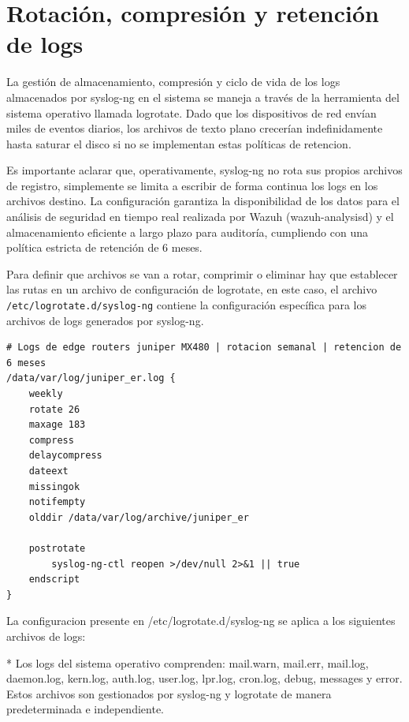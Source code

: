\section{Rotación, compresión y retención de logs}
La gestión de almacenamiento, compresión y ciclo de vida de los logs almacenados por syslog-ng en el sistema se maneja a través de la herramienta del sistema operativo llamada logrotate. Dado que los dispositivos de red envían miles de eventos diarios, los archivos de texto plano crecerían indefinidamente hasta saturar el disco si no se implementan estas políticas de retencion.

Es importante aclarar que, operativamente, syslog-ng no rota sus propios archivos de registro, simplemente se limita a escribir de forma continua los logs en los archivos destino. La configuración garantiza la disponibilidad de los datos para el análisis de seguridad en tiempo real realizada por Wazuh (wazuh-analysisd) y el almacenamiento eficiente a largo plazo para auditoría, cumpliendo con una política estricta de retención de 6 meses.

Para definir que archivos se van a rotar, comprimir o eliminar hay que establecer las rutas en un archivo de configuración de logrotate, en este caso, el archivo \texttt{/etc/logrotate.d/syslog-ng} contiene la configuración específica para los archivos de logs generados por syslog-ng.

\begin{lstlisting}[style=logstyle,
    caption={Fragmento de código de configuración de logrotate correspondiente a los logs de edge routers Juniper MX480.}
]
# Logs de edge routers juniper MX480 | rotacion semanal | retencion de 6 meses
/data/var/log/juniper_er.log {
    weekly
    rotate 26
    maxage 183
    compress
    delaycompress
    dateext
    missingok
    notifempty
    olddir /data/var/log/archive/juniper_er

    postrotate
        syslog-ng-ctl reopen >/dev/null 2>&1 || true
    endscript
}
\end{lstlisting}

La configuracion presente en /etc/logrotate.d/syslog-ng se aplica a los siguientes archivos de logs:



* Los logs del sistema operativo comprenden: mail.warn, mail.err, mail.log, daemon.log, kern.log, auth.log, user.log, lpr.log, cron.log, debug, messages y error. Estos archivos son gestionados por syslog-ng y logrotate de manera predeterminada e independiente.

